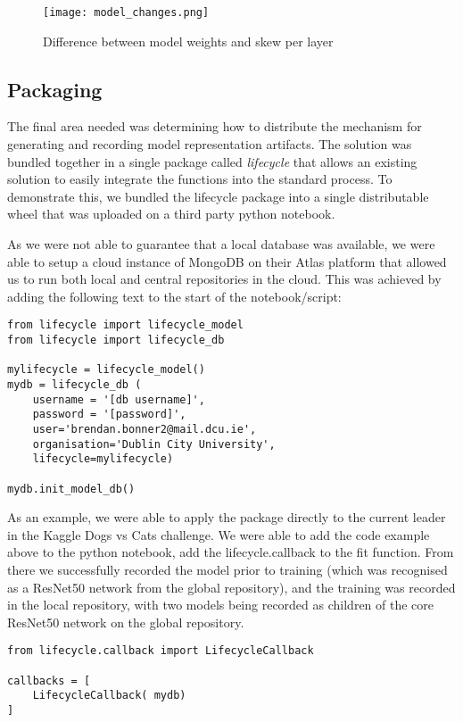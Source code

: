 \begin{figure}[!ht]
    \centering
    \texttt{[image: model\_changes.png]}
    \caption{Difference between model weights and skew per layer}
    \label{fig:weightdiff}
\end{figure}


\subsection{Packaging}

The final area needed was determining how to distribute the mechanism for generating and recording model representation artifacts. The solution was bundled together in a single package called \textit{lifecycle} that allows an existing solution to easily integrate the functions into the standard process. To demonstrate this, we bundled the lifecycle package into a single distributable wheel that was uploaded on a third party python notebook.

As we were not able to guarantee that a local database was available, we were able to setup a cloud instance of MongoDB on their Atlas platform that allowed us to run both local and central repositories in the cloud. This was achieved by adding the following text to the start of the notebook/script:

\begin{lstlisting}
from lifecycle import lifecycle_model
from lifecycle import lifecycle_db

mylifecycle = lifecycle_model()
mydb = lifecycle_db (
    username = '[db username]',
    password = '[password]',
    user='brendan.bonner2@mail.dcu.ie',
    organisation='Dublin City University',
    lifecycle=mylifecycle)

mydb.init_model_db()
\end{lstlisting}

As an example, we were able to apply the package directly to the current leader in the Kaggle Dogs vs Cats challenge\cite{golleMachineLearningAttacks2008}. We were able to add the code example above to the python notebook, add the lifecycle.callback to the fit function. From there we successfully recorded the model prior to training (which was recognised as a ResNet50 network from the global repository), and the training was recorded in the local repository, with two models being recorded as children of the core ResNet50 network on the global repository.

\begin{lstlisting}
from lifecycle.callback import LifecycleCallback

callbacks = [
    LifecycleCallback( mydb)
]
\end{lstlisting}

